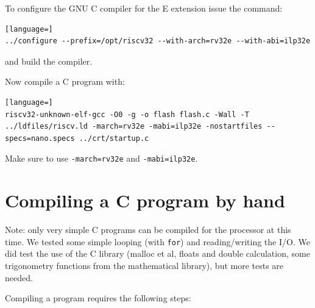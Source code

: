 \documentclass[12pt]{article}
\begin{document}
To configure the GNU C compiler for the E extension issue the command:

\begin{lstlisting}[language=]
../configure --prefix=/opt/riscv32 --with-arch=rv32e --with-abi=ilp32e
\end{lstlisting}

and build the compiler.

Now compile a C program with:

\begin{lstlisting}[language=]
riscv32-unknown-elf-gcc -O0 -g -o flash flash.c -Wall -T ../ldfiles/riscv.ld -march=rv32e -mabi=ilp32e -nostartfiles --specs=nano.specs ../crt/startup.c
\end{lstlisting}

Make sure to use \texttt{-march=rv32e} and \texttt{-mabi=ilp32e}.


\section{Compiling a C program by hand}
Note: only very simple C programs can be compiled for the processor at this time. We tested some simple looping (with \texttt{for}) and reading/writing the I/O. We did test the use of the C library (malloc et al, floats and double calculation, some trigonometry  functions from the mathematical library), but more tests are needed.

Compiling a program requires the following steps:
\end{document}
